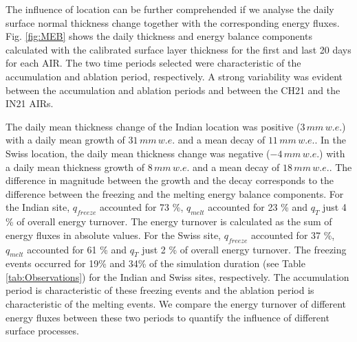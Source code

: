 \documentclass[utf8]{frontiersSCNS}
\begin{document}
The influence of location can be further comprehended if we analyse the daily surface normal thickness change
together with the corresponding energy fluxes. Fig. \ref{fig:MEB} shows the daily thickness and energy balance
components calculated with the calibrated surface layer thickness for the first and last 20 days for each AIR. The two time
periods selected were characteristic of the accumulation and ablation period, respectively. A strong variability
was evident between the accumulation and ablation periods and between the CH21 and the IN21 AIRs.

The daily mean thickness change of the Indian location was positive ($3\, mm \,w.e.$) with a daily mean growth
of $31\, mm \,w.e.$ and a mean decay of $11\, mm \,w.e.$. In the Swiss location, the daily mean
thickness change was negative ($-4\, mm \,w.e.$) with a daily mean thickness growth of $8\, mm \,w.e.$ and a
mean decay of $18\, mm \,w.e.$. The difference in magnitude between the growth and the decay corresponds to the
difference between the freezing and the melting energy balance components. For the Indian site, $q_{freeze}$
accounted for 73 \%, $q_{melt}$ accounted for 23 \% and $q_{T}$ just 4 \% of overall energy turnover. The energy
turnover is calculated as the sum of energy fluxes in absolute values. For the Swiss site, $q_{freeze}$
accounted for 37 \%, $q_{melt}$ accounted for 61 \%  and $q_{T}$ just 2 \% of overall energy turnover. The
freezing events occurred for 19\% and 34\% of the simulation duration (see Table \ref{tab:Observations}) for the
Indian and Swiss sites, respectively. The accumulation period is characteristic of these freezing events and the
ablation period is characteristic of the melting events. We compare the energy turnover of different energy
fluxes between these two periods to quantify the influence of different surface processes.
\end{document}
